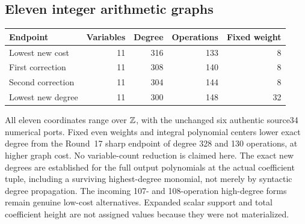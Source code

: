 \subsection{Eleven integer arithmetic graphs}
\begin{center}\small
\begin{tabular}{@{}lrrrr@{}}\toprule
Endpoint & Variables & Degree & Operations & Fixed weight\\\midrule
Lowest new cost &11&316&133&8\\
First correction &11&308&140&8\\
Second correction &11&304&144&8\\
Lowest new degree &11&300&148&32\\\bottomrule
\end{tabular}
\end{center}
All eleven coordinates range over $\mathbb Z$, with the unchanged six authentic
source34 numerical ports. Fixed even weights and integral polynomial
centers lower exact degree from the Round~17 sharp endpoint of degree 328 and 130 operations,
at higher graph cost. No variable-count reduction is claimed here. The exact new degrees are established for the full output
polynomials at the actual coefficient tuple, including a surviving
highest-degree monomial, not merely by syntactic degree propagation.
The incoming 107- and 108-operation high-degree forms remain genuine
low-cost alternatives. Expanded scalar support and total coefficient
height are not assigned values because they were not materialized.
